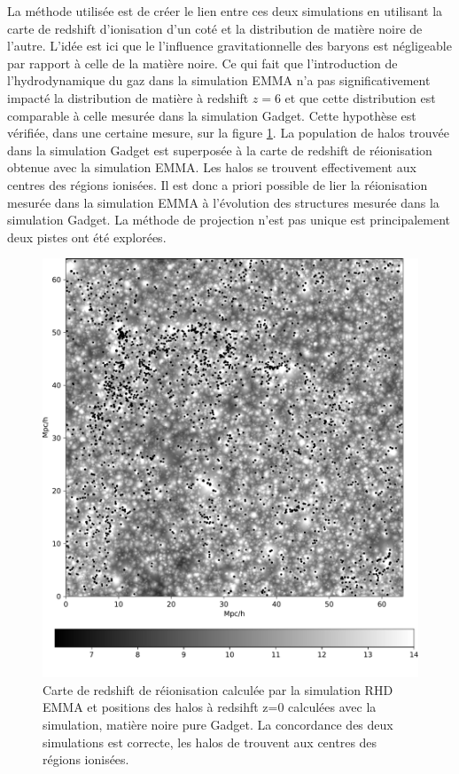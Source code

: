 La méthode utilisée est de créer le lien entre ces deux simulations en utilisant la carte de redshift d'ionisation d'un coté et la distribution de matière noire de l'autre.
L'idée est ici que le l'influence gravitationnelle des baryons est négligeable par rapport à celle de la matière noire.
Ce qui fait que l'introduction de l'hydrodynamique du gaz dans la simulation EMMA n'a pas significativement impacté la distribution de matière à redshift $z=6$ et que cette distribution est comparable à celle mesurée dans la simulation Gadget.
Cette hypothèse est vérifiée, dans une certaine mesure, sur la figure \ref{fig:zmapcomp}.
La population de halos trouvée dans la simulation Gadget est superposée à la carte de redshift de réionisation obtenue avec la simulation EMMA.
Les halos se trouvent effectivement aux centres des régions ionisées.
Il est donc a priori possible de lier la réionisation mesurée dans la simulation EMMA à l'évolution des structures mesurée dans la simulation Gadget.
La méthode de projection n'est pas unique est principalement deux pistes ont été explorées.


\begin{figure}
		\centering
        \includegraphics[width=.95\linewidth]{img/05/maphaloh.pdf} 
        \caption[Carte de redshift et halos]{Carte de redshift de réionisation calculée par la simulation \ac{RHD} EMMA et positions des halos à redsihft z=0 calculées avec la simulation, matière noire pure Gadget.
        La concordance des deux simulations est correcte, les halos de trouvent aux centres des régions ionisées.
		\label{fig:zmapcomp}}
\end{figure}


